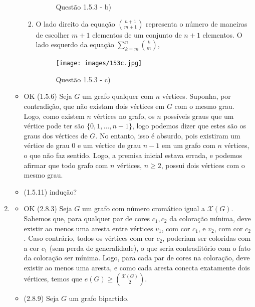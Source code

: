 \documentclass{article}
\begin{document}
\begin{enumerate}
\begin{itemize}
\begin{enumerate}
\begin{figure}[H]
				                  \caption{Questão 1.5.3 - b)}
			                  \end{figure}
			            \item
			                  O lado direito da equação \(\binom{n+1}{m+1}\) representa o número de maneiras de escolher \(m+1\) elementos de um conjunto de \(n+1\) elementos.
			                  O lado esquerdo da equação \(\sum_{k=m}^{n} \binom{k}{m}\),
			                  \begin{figure}[H]
				                  \centering
				                  \texttt{[image: images/153c.jpg]}
				                  \caption{Questão 1.5.3 - c)}
			                  \end{figure}
		            \end{enumerate}
		      \item OK (1.5.6) Seja \(G\) um grafo qualquer com \(n\) vértices. Suponha, por contradição, que não existam dois vértices em \(G\) com o mesmo grau. Logo, como existem \(n\) vértices no grafo, os \(n\) possíveis graus que um vértice pode ter são \(\{0, 1, \dots, n-1\}\), logo podemos dizer que estes são os graus dos vértices de \(G\). No entanto, isso é absurdo, pois existiram um vértice de grau 0 e um vértice de grau \(n-1\) em um grafo com \(n\) vértices, o que não faz sentido. Logo, a premisa inicial estava errada, e podemos afirmar que todo grafo com \(n\) vértices, \(n \geq 2\), possui dois vértices com o mesmo grau.
		      \item (1.5.11) indução?
	      \end{itemize}
	\item \begin{itemize}
		      \item OK (2.8.3) Seja \(G\) um grafo com número cromático igual a \(\mathcal{X}(G)\). Sabemos que, para qualquer par de cores \(c_1, c_2\) da coloração mínima, deve existir ao menos uma aresta entre vértices \(v_1\), com cor \(c_1\), e \(v_2\), com cor \(c_2\). Caso contrário, todos os vértices com cor \(c_2\), poderiam ser coloridas com a cor \(c_1\) (sem perda de generalidade), o que seria contraditório com o fato da coloração ser mínima. Logo, para cada par de cores na coloração, deve existir ao menos uma aresta, e como cada aresta conecta exatamente dois vértices, temos que \(e(G) \ge \binom{\mathcal{X}(G)}{2}\).
		      \item (2.8.9) Seja \(G\) um grafo bipartido. 



\end{itemize}
\end{enumerate}
\end{document}
